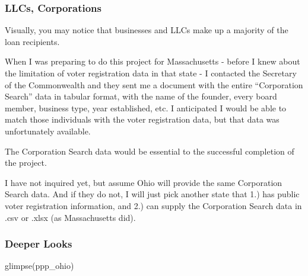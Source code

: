 \documentclass[
  letterpaper,
  DIV=11,
  numbers=noendperiod]{scrartcl}
\newenvironment{Shaded}{\begin{snugshade}}{\end{snugshade}}
\newcommand{\FunctionTok}[1]{\textcolor[rgb]{0.28,0.35,0.67}{#1}}
\newcommand{\NormalTok}[1]{\textcolor[rgb]{0.00,0.23,0.31}{#1}}
\begin{document}
\hypertarget{llcs-corporations}{%
\subsubsection{LLCs, Corporations}\label{llcs-corporations}}

Visually, you may notice that businesses and LLCs make up a majority of
the loan recipients.

When I was preparing to do this project for Massachusetts - before I
knew about the limitation of voter registration data in that state - I
contacted the Secretary of the Commonwealth and they sent me a document
with the entire ``Corporation Search'' data in tabular format, with the
name of the founder, every board member, business type, year
established, etc. I anticipated I would be able to match those
individuals with the voter registration data, but that data was
unfortunately available.

The Corporation Search data would be essential to the successful
completion of the project.

I have not inquired yet, but assume Ohio will provide the same
Corporation Search data. And if they do not, I will just pick another
state that 1.) has public voter registration information, and 2.) can
supply the Corporation Search data in .csv or .xlsx (as Massachusetts
did).

\hypertarget{deeper-looks}{%
\subsubsection{Deeper Looks}\label{deeper-looks}}

\begin{Shaded}
\begin{Highlighting}[]
\FunctionTok{glimpse}\NormalTok{(ppp\_ohio)}
\end{Highlighting}
\end{Shaded}
\end{document}
